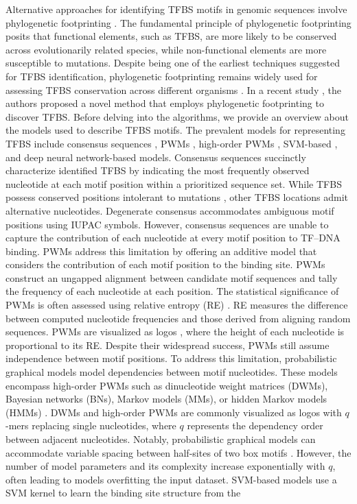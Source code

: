 \documentclass[a4paper, titlepage, openright]{book}
\begin{document}
Alternative approaches for identifying TFBS motifs in genomic sequences involve phylogenetic footprinting \citep{mccue2001phylogenetic,blanchette2002discovery}. The fundamental principle of phylogenetic footprinting posits that functional elements, such as TFBS, are more likely to be conserved across evolutionarily related species, while non-functional elements are more susceptible to mutations. Despite being one of the earliest techniques suggested for TFBS identification, phylogenetic footprinting remains widely used for assessing TFBS conservation across different organisms \citep{balazadeh2011ors1, xu2012cis,katara2012phylogenetic}. In a recent study \citep{glenwinkel2014targetortho}, the authors proposed a novel method that employs phylogenetic footprinting to discover TFBS. Before delving into the algorithms, we provide an overview about the models used to describe TFBS motifs. The prevalent models for representing TFBS include consensus sequences \citep{day1992critical}, PWMs \citep{stormo2000dna,stormo2013modeling}, high-order PWMs \citep{siddharthan2010dinucleotide,korhonen2017fast}, SVM-based \citep{gorkin2012integration}, and deep neural network-based \citep{he2021survey} models. Consensus sequences succinctly characterize identified TFBS by indicating the most frequently observed nucleotide at each motif position within a prioritized sequence set. While TFBS possess conserved positions intolerant to mutations \citep{li2015human}, other TFBS locations admit alternative nucleotides. Degenerate consensus accommodates ambiguous motif positions using IUPAC symbols. However, consensus sequences are unable to capture the contribution of each nucleotide at every motif position to TF–DNA binding. PWMs address this limitation by offering an additive model that considers the contribution of each motif position to the binding site. PWMs construct an ungapped alignment between candidate motif sequences and tally the frequency of each nucleotide at each position. The statistical significance of PWMs is often assessed using relative entropy (RE) \citep{stormo1998information}. RE measures the difference between computed nucleotide frequencies and those derived from aligning random sequences. PWMs are visualized as logos \citep{schneider1990sequence}, where the height of each nucleotide is proportional to its RE. Despite their widespread success, PWMs still assume independence between motif positions. To address this limitation, probabilistic graphical models model dependencies between motif nucleotides. These models encompass high-order PWMs such as dinucleotide weight matrices (DWMs), Bayesian networks (BNs), Markov models (MMs), or hidden Markov models (HMMs) \citep{siddharthan2010dinucleotide,korhonen2017fast,barash2003modeling,siebert2016bayesian}. DWMs and high-order PWMs are commonly visualized as logos with $q$-mers replacing single nucleotides, where $q$ represents the dependency order between adjacent nucleotides. Notably, probabilistic graphical models can accommodate variable spacing between half-sites of two box motifs \citep{mathelier2013next}. However, the number of model parameters and its complexity increase exponentially with $q$, often leading to models overfitting the input dataset. SVM-based models use a SVM kernel to learn the binding site structure from the 
\end{document}

